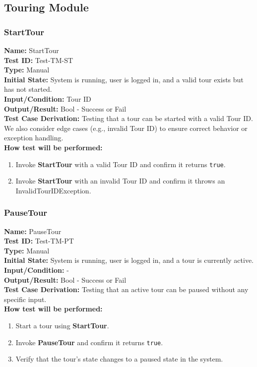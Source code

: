 \documentclass[12pt, titlepage]{article}
\begin{document}
\subsection{Touring Module}

\subsubsection{StartTour}
\textbf{Name:} StartTour \label{itm:Test-TM-ST} \\
\textbf{Test ID:} Test-TM-ST \\
\textbf{Type:} Manual \\
\textbf{Initial State:} System is running, user is logged in, and a valid tour exists but has not started. \\
\textbf{Input/Condition:} Tour ID \\
\textbf{Output/Result:} Bool - Success or Fail \\
\textbf{Test Case Derivation:} Testing that a tour can be started with a valid Tour ID. We also consider edge cases (e.g., invalid Tour ID) to ensure correct behavior or exception handling. \\
\textbf{How test will be performed:}
\begin{enumerate}
    \item Invoke \textbf{StartTour} with a valid Tour ID and confirm it returns \texttt{true}.
    \item Invoke \textbf{StartTour} with an invalid Tour ID and confirm it throws an InvalidTourIDException.
\end{enumerate}

\subsubsection{PauseTour}
\textbf{Name:} PauseTour \label{itm:Test-TM-PT} \\
\textbf{Test ID:} Test-TM-PT \\
\textbf{Type:} Manual \\
\textbf{Initial State:} System is running, user is logged in, and a tour is currently active. \\
\textbf{Input/Condition:} - \\
\textbf{Output/Result:} Bool - Success or Fail \\
\textbf{Test Case Derivation:} Testing that an active tour can be paused without any specific input. \\
\textbf{How test will be performed:}
\begin{enumerate}
    \item Start a tour using \textbf{StartTour}.
    \item Invoke \textbf{PauseTour} and confirm it returns \texttt{true}.
    \item Verify that the tour’s state changes to a paused state in the system.
\end{enumerate}
\end{document}
